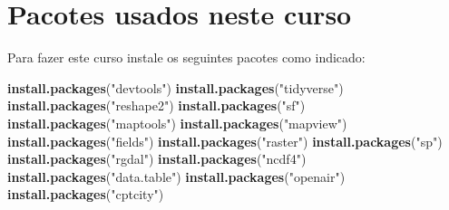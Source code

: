 \documentclass[]{book}
\newenvironment{Shaded}{\begin{snugshade}}{\end{snugshade}}
\newcommand{\KeywordTok}[1]{\textcolor[rgb]{0.13,0.29,0.53}{\textbf{#1}}}
\newcommand{\StringTok}[1]{\textcolor[rgb]{0.31,0.60,0.02}{#1}}
\newcommand{\NormalTok}[1]{#1}
\begin{document}
\section{Pacotes usados neste curso}\label{pacotes-usados-neste-curso}

Para fazer este curso instale os seguintes pacotes como indicado:

\begin{Shaded}
\begin{Highlighting}[]
\KeywordTok{install.packages}\NormalTok{(}\StringTok{"devtools"}\NormalTok{)}
\KeywordTok{install.packages}\NormalTok{(}\StringTok{"tidyverse"}\NormalTok{)}
\KeywordTok{install.packages}\NormalTok{(}\StringTok{"reshape2"}\NormalTok{)}
\KeywordTok{install.packages}\NormalTok{(}\StringTok{"sf"}\NormalTok{)}
\KeywordTok{install.packages}\NormalTok{(}\StringTok{"maptools"}\NormalTok{)}
\KeywordTok{install.packages}\NormalTok{(}\StringTok{"mapview"}\NormalTok{)}
\KeywordTok{install.packages}\NormalTok{(}\StringTok{"fields"}\NormalTok{)}
\KeywordTok{install.packages}\NormalTok{(}\StringTok{"raster"}\NormalTok{)}
\KeywordTok{install.packages}\NormalTok{(}\StringTok{"sp"}\NormalTok{)}
\KeywordTok{install.packages}\NormalTok{(}\StringTok{"rgdal"}\NormalTok{)}
\KeywordTok{install.packages}\NormalTok{(}\StringTok{"ncdf4"}\NormalTok{)}
\KeywordTok{install.packages}\NormalTok{(}\StringTok{"data.table"}\NormalTok{)}
\KeywordTok{install.packages}\NormalTok{(}\StringTok{"openair"}\NormalTok{)}
\KeywordTok{install.packages}\NormalTok{(}\StringTok{"cptcity"}\NormalTok{)}
\end{Highlighting}
\end{Shaded}
\end{document}
